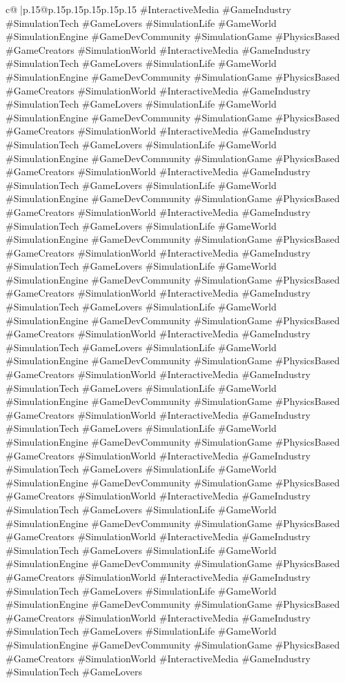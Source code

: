 \documentclass{article}
\begin{document}
{\begin{supertabular}{c@{$\;$}|p{.15\linewidth}@{}p{.15\linewidth}p{.15\linewidth}p{.15\linewidth}p{.15\linewidth}p{.15\linewidth}}
{{{\#InteractiveMedia \#GameIndustry \#SimulationTech \#GameLovers \#SimulationLife \#GameWorld \#SimulationEngine \#GameDevCommunity \#SimulationGame \#PhysicsBased \#GameCreators \#SimulationWorld \#InteractiveMedia \#GameIndustry \#SimulationTech \#GameLovers \#SimulationLife \#GameWorld \#SimulationEngine \#GameDevCommunity \#SimulationGame \#PhysicsBased \#GameCreators \#SimulationWorld \#InteractiveMedia \#GameIndustry \#SimulationTech \#GameLovers \#SimulationLife \#GameWorld \#SimulationEngine \#GameDevCommunity \#SimulationGame \#PhysicsBased \#GameCreators \#SimulationWorld \#InteractiveMedia \#GameIndustry \#SimulationTech \#GameLovers \#SimulationLife \#GameWorld \#SimulationEngine \#GameDevCommunity \#SimulationGame \#PhysicsBased \#GameCreators \#SimulationWorld \#InteractiveMedia \#GameIndustry \#SimulationTech \#GameLovers \#SimulationLife \#GameWorld \#SimulationEngine \#GameDevCommunity \#SimulationGame \#PhysicsBased \#GameCreators \#SimulationWorld \#InteractiveMedia \#GameIndustry \#SimulationTech \#GameLovers \#SimulationLife \#GameWorld \#SimulationEngine \#GameDevCommunity \#SimulationGame \#PhysicsBased \#GameCreators \#SimulationWorld \#InteractiveMedia \#GameIndustry \#SimulationTech \#GameLovers \#SimulationLife \#GameWorld \#SimulationEngine \#GameDevCommunity \#SimulationGame \#PhysicsBased \#GameCreators \#SimulationWorld \#InteractiveMedia \#GameIndustry \#SimulationTech \#GameLovers \#SimulationLife \#GameWorld \#SimulationEngine \#GameDevCommunity \#SimulationGame \#PhysicsBased \#GameCreators \#SimulationWorld \#InteractiveMedia \#GameIndustry \#SimulationTech \#GameLovers \#SimulationLife \#GameWorld \#SimulationEngine \#GameDevCommunity \#SimulationGame \#PhysicsBased \#GameCreators \#SimulationWorld \#InteractiveMedia \#GameIndustry \#SimulationTech \#GameLovers \#SimulationLife \#GameWorld \#SimulationEngine \#GameDevCommunity \#SimulationGame \#PhysicsBased \#GameCreators \#SimulationWorld \#InteractiveMedia \#GameIndustry \#SimulationTech \#GameLovers \#SimulationLife \#GameWorld \#SimulationEngine \#GameDevCommunity \#SimulationGame \#PhysicsBased \#GameCreators \#SimulationWorld \#InteractiveMedia \#GameIndustry \#SimulationTech \#GameLovers \#SimulationLife \#GameWorld \#SimulationEngine \#GameDevCommunity \#SimulationGame \#PhysicsBased \#GameCreators \#SimulationWorld \#InteractiveMedia \#GameIndustry \#SimulationTech \#GameLovers \#SimulationLife \#GameWorld \#SimulationEngine \#GameDevCommunity \#SimulationGame \#PhysicsBased \#GameCreators \#SimulationWorld \#InteractiveMedia \#GameIndustry \#SimulationTech \#GameLovers \#SimulationLife \#GameWorld \#SimulationEngine \#GameDevCommunity \#SimulationGame \#PhysicsBased \#GameCreators \#SimulationWorld \#InteractiveMedia \#GameIndustry \#SimulationTech \#GameLovers \#SimulationLife \#GameWorld \#SimulationEngine \#GameDevCommunity \#SimulationGame \#PhysicsBased \#GameCreators \#SimulationWorld \#InteractiveMedia \#GameIndustry \#SimulationTech \#GameLovers \#SimulationLife \#GameWorld \#SimulationEngine \#GameDevCommunity \#SimulationGame \#PhysicsBased \#GameCreators \#SimulationWorld \#InteractiveMedia \#GameIndustry \#SimulationTech \#GameLovers }}}
\end{supertabular}}
\end{document}
